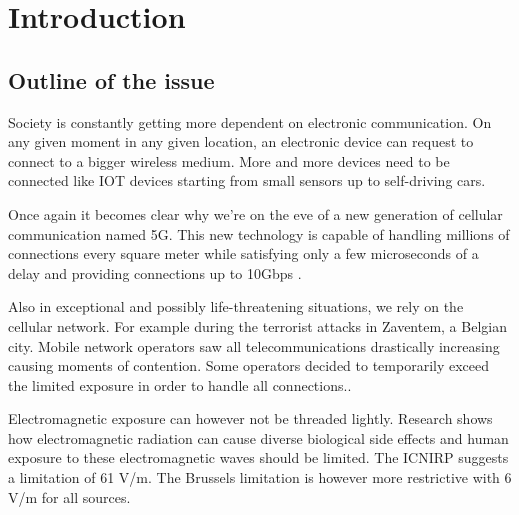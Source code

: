 %

\chapter{Introduction}
\label{chap:intro}

\section{Outline of the issue}
\label{sec:issue}

Society is constantly getting more dependent on electronic communication. On any given moment in any given location, an electronic device
can request to connect to a bigger wireless medium. More and more devices need to be connected like IOT devices starting from small sensors up to self-driving cars.

Once again it becomes clear why we're on the eve of a new generation of cellular communication named 5G. 
This new technology is capable of handling millions of connections every square meter %
while satisfying only a few microseconds of a delay and providing connections up to 10Gbps \cite{bioeffects}.

Also in exceptional and possibly life-threatening situations, we rely on the cellular network. For example during the terrorist attacks in Zaventem, a Belgian city.
Mobile network operators saw all telecommunications drastically increasing causing moments of contention. Some operators decided to temporarily exceed the limited exposure in
order to handle all connections.. \cite{baseZaventem}

Electromagnetic exposure can however not be threaded lightly. Research shows how electromagnetic radiation can cause diverse biological side effects \cite{bio-effects} and human exposure to these electromagnetic waves should be limited. The ICNIRP suggests a limitation of 61 V/m.  The Brussels limitation is however more restrictive with 6 V/m for all sources.
